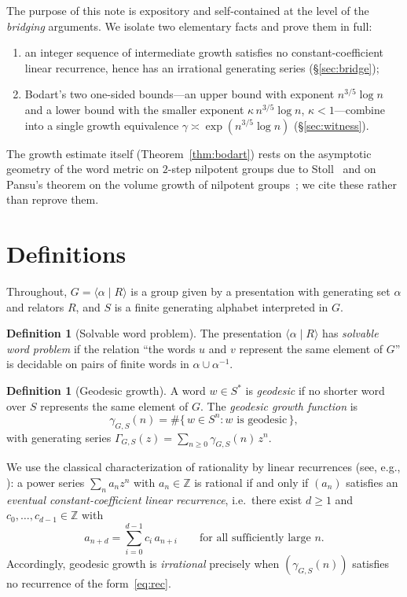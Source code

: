 \documentclass[reqno]{amsart}
\theoremstyle{plain}
\theoremstyle{definition}
\newtheorem{definition}[theorem]{Definition}
\theoremstyle{remark}
\newcommand{\Z}{\mathbb{Z}}
\newcommand{\geod}{\gamma}
\begin{document}
The purpose of this note is expository and self-contained at the level of the \emph{bridging}
arguments. We isolate two elementary facts and prove them in full:
\begin{enumerate}[label=(\roman*)]
  \item an integer sequence of intermediate growth satisfies no constant-coefficient linear
    recurrence, hence has an irrational generating series (\S\ref{sec:bridge});
  \item Bodart's two one-sided bounds---an upper bound with exponent $n^{3/5}\log n$ and a lower
    bound with the smaller exponent $\kappa\,n^{3/5}\log n$, $\kappa<1$---combine into a single
    growth equivalence $\geod\asymp\exp(n^{3/5}\log n)$ (\S\ref{sec:witness}).
\end{enumerate}
The growth estimate itself (Theorem~\ref{thm:bodart}) rests on the asymptotic geometry of the word
metric on $2$-step nilpotent groups due to Stoll~\cite{Stoll} and on Pansu's theorem on the
volume growth of nilpotent groups~\cite{Pansu}; we cite these rather than reprove them.

\section{Definitions}
\label{sec:defs}

Throughout, $G=\langle \alpha\mid R\rangle$ is a group given by a presentation with generating set
$\alpha$ and relators $R$, and $S$ is a finite generating alphabet interpreted in $G$.

\begin{definition}[Solvable word problem]
The presentation $\langle\alpha\mid R\rangle$ has \emph{solvable word problem} if the relation
``the words $u$ and $v$ represent the same element of $G$'' is decidable on pairs of finite words
in $\alpha\cup\alpha^{-1}$.
\end{definition}

\begin{definition}[Geodesic growth]
A word $w\in S^\ast$ is \emph{geodesic} if no shorter word over $S$ represents the same element of
$G$. The \emph{geodesic growth function} is
\[
  \geod_{G,S}(n)=\#\{\,w\in S^{n}: w\text{ is geodesic}\,\},
\]
with generating series $\Gamma_{G,S}(z)=\sum_{n\ge0}\geod_{G,S}(n)\,z^n$.
\end{definition}

We use the classical characterization of rationality by linear recurrences (see, e.g.,
\cite[\S IV]{Bronnimann}): a power series $\sum_{n}a_n z^n$ with $a_n\in\Z$ is rational if and only
if $(a_n)$ satisfies an \emph{eventual constant-coefficient linear recurrence}, i.e.\ there exist
$d\ge1$ and $c_0,\dots,c_{d-1}\in\Z$ with
\begin{equation}\label{eq:rec}
  a_{n+d}=\sum_{i=0}^{d-1}c_i\,a_{n+i}\qquad\text{for all sufficiently large }n.
\end{equation}
Accordingly, geodesic growth is \emph{irrational} precisely when $(\geod_{G,S}(n))$ satisfies no
recurrence of the form~\eqref{eq:rec}.
\end{document}
